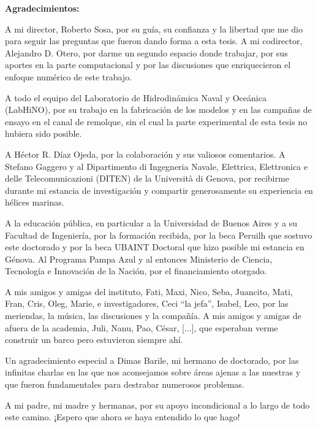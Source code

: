 
\clearpage
\begin{DatosPlantilla}
{\bfseries Agradecimientos:}\par
\setlength{\parindent}{0.5cm}

A mi director, Roberto Sosa, por su guía, su confianza y la libertad que me dio
para seguir las preguntas que fueron dando forma a esta tesis. A mi codirector,
Alejandro D. Otero, por darme un segundo espacio donde trabajar, por sus aportes
en la parte computacional y por las discusiones que enriquecieron el enfoque
numérico de este trabajo.

A todo el equipo del Laboratorio de Hidrodinámica Naval y Oceánica (LabHiNO),
por su trabajo en la fabricación de los modelos y en las campañas de ensayo en
el canal de remolque, sin el cual la parte experimental de esta tesis no hubiera
sido posible.

A Héctor R. Díaz Ojeda, por la colaboración y sus valiosos comentarios. A
Stefano Gaggero y al Dipartimento di Ingegneria Navale, Elettrica, Elettronica e
delle Telecomunicazioni (DITEN) de la Università di Genova, por recibirme
durante mi estancia de investigación y compartir generosamente su experiencia en
hélices marinas.

A la educación pública, en particular a la Universidad de Buenos Aires y a su
Facultad de Ingeniería, por la formación recibida, por la beca Peruilh que
sostuvo este doctorado y por la beca UBAINT Doctoral que hizo posible mi
estancia en Génova. Al Programa Pampa Azul y al entonces Ministerio de
Ciencia, Tecnología e Innovación de la Nación, por el financiamiento otorgado.

A mis amigos y amigas del instituto, Fati, Maxi, Nico, Seba, Juancito, Mati,
Fran, Cris, Oleg, Marie, e investigadores, Ceci ``la jefa'', Isabel, Leo, por las
meriendas, la música, las discusiones y la compañía. A mis amigos y amigas de afuera de la academia,
Juli, Nanu, Pao, César, [...], que esperaban verme construir un barco pero
estuvieron siempre ahí.

Un agradecimiento especial a Dimas Barile, mi hermano de doctorado, por las infinitas charlas en las que nos aconsejamos sobre áreas ajenas a las nuestras y que fueron fundamentales para destrabar numerosos problemas.

A mi padre, mi madre y hermanas, por su apoyo incondicional a lo largo de todo este camino. ¡Espero que ahora se haya entendido lo que hago!
\end{DatosPlantilla}